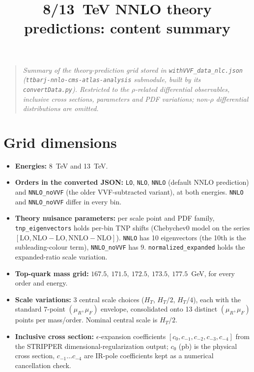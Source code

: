 \documentclass[11pt,a4paper]{article}
\title{8/13~TeV NNLO theory predictions: content summary}
\author{}
\date{}
\newcommand{\code}[1]{\texttt{#1}}
\begin{document}
\maketitle
\vspace{-2.5em}

\begin{quote}
\textit{Summary of the theory-prediction grid stored in
\code{withVVF\_data\_nlc.json}\newline
(\code{ttbarj-nnlo-cms-atlas-analysis} submodule, built by its
\code{convertData.py}). Restricted to the
$\rho$-related differential observables, inclusive cross sections,
parameters and PDF variations; non-$\rho$ differential distributions are
omitted.}
\end{quote}

\section*{Grid dimensions}

\begin{itemize}
  \item \textbf{Energies:} 8~TeV and 13~TeV.
  \item \textbf{Orders in the converted JSON:} \code{LO}, \code{NLO},
        \code{NNLO} (default NNLO prediction) and \code{NNLO\_noVVF} (the
        older VVF-subtracted variant), at both energies. \code{NNLO} and
        \code{NNLO\_noVVF} differ in every bin.
  \item \textbf{Theory nuisance parameters:} per scale point and PDF family,
        \code{tnp\_eigenvectors} holds per-bin TNP shifts (Chebychev0 model
        on the series $[\mathrm{LO}, \mathrm{NLO}-\mathrm{LO},
        \mathrm{NNLO}-\mathrm{NLO}]$). \code{NNLO} has 10 eigenvectors (the
        10th is the subleading-colour term), \code{NNLO\_noVVF} has 9.
        \code{normalized\_expanded} holds the expanded-ratio scale variation.
  \item \textbf{Top-quark mass grid:} $167.5,\ 171.5,\ 172.5,\ 173.5,\
        177.5$~GeV, for every order and energy.
  \item \textbf{Scale variations:} 3 central scale choices ($H_T$, $H_T/2$,
        $H_T/4$), each with the standard 7-point $(\mu_R,\mu_F)$ envelope,
        consolidated onto 13 distinct $(\mu_R,\mu_F)$ points per mass/order.
        Nominal central scale is $H_T/2$.
  \item \textbf{Inclusive cross section:} $\epsilon$-expansion coefficients
        $[c_0, c_{-1}, c_{-2}, c_{-3}, c_{-4}]$ from the STRIPPER
        dimensional-regularization output; $c_0$ (pb) is the physical cross
        section, $c_{-1}\ldots c_{-4}$ are IR-pole coefficients kept as a
        numerical cancellation check.
\end{itemize}
\end{document}
